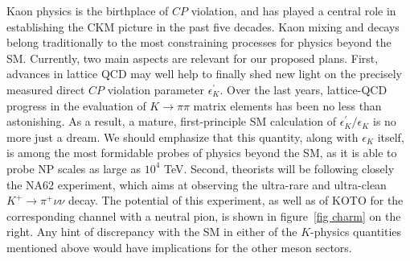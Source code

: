   Kaon physics is the birthplace of $CP$ violation, and has played a central
role in establishing the CKM picture in the past five decades. Kaon mixing and decays belong traditionally to the most constraining processes for physics beyond the SM. Currently, two main aspects are relevant for our proposed plans. First, advances in lattice QCD may well help to finally shed new light on the precisely measured direct $CP$ violation parameter $\epsilon^{\prime}_K$. Over the last years, lattice-QCD progress in the evaluation of $K \to \pi \pi$ matrix elements has been no less than astonishing. As a result, a mature, first-principle SM calculation of $\epsilon^\prime_K/\epsilon_K$ is no more just a dream. We should emphasize that this quantity, along with $\epsilon_K$ itself, is among the most formidable probes of physics beyond the SM, as it is able to probe NP scales as large as $10^{4}$ TeV. Second, theorists will be following closely the NA62 experiment, which aims at observing the ultra-rare and ultra-clean $K^{+}\rightarrow\pi ^{+}\nu\nu$ decay. The potential of this experiment, as well as of KOTO for the corresponding channel with a neutral pion, is shown in figure~\ref{fig charm} on the right.  Any hint of discrepancy with the SM in either of the $K$-physics quantities mentioned above would have implications for the other meson sectors.


